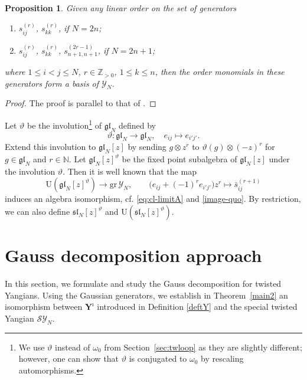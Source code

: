 \documentclass[11pt,reqno]{amsart}
\numberwithin{equation}{section}
\newtheorem{prop}[thm]{Proposition}
\theoremstyle{definition}
\theoremstyle{remark}
\newcommand{\beq}{\begin{equation}}
\newcommand{\eeq}{\end{equation}}
\newcommand{\bZ}{\mathbb{Z}}
\newcommand{\bN}{\mathbb{N}}
\newcommand{\gl}{\mathfrak{gl}}
\newcommand{\gr}{{\mathrm{gr}}}
\newcommand{\lle}{\leqslant}
\newcommand{\Y}{{\mathscr{Y}}}
\newcommand{\SY}{{\mathscr{SY}}}
\newcommand{\Yi}{{\mathbf{Y}^\imath}}
\begin{document}
\begin{prop}\label{pbwprop1}
Given any linear order on the set of generators
\begin{enumerate}
    \item $s_{ij}^{(r)}$, $s_{kk}^{(r)}$, if $N=2n$;
    \item $s_{ij}^{(r)}$, $s_{kk}^{(r)}$, $s_{n+1,n+1}^{(2r-1)}$, if $N=2n+1$;
\end{enumerate}
where $1\lle i<j\lle N$, $r\in\bZ_{>0}$, $1\lle k\lle n$, then the order monomials in these generators form a basis of $\Y_N$.
\end{prop}
\begin{proof}
The proof is parallel to that of \cite[Thm. 3.1 \& Coro. 3.2]{MR02}.
\end{proof}

Let $\vartheta$ be the involution\footnote{We use $\vartheta$ instead of $\omega_0$ from Section~\ref{sec:twloop} as they are slightly different; however, one can show that $\vartheta$ is conjugated to $\omega_0$ by rescaling automorphisms.} of $\gl_N$ defined by
\beq\label{varth}
\vartheta: \gl_N\longrightarrow \gl_N,\quad e_{ij}\mapsto e_{i'j'}.
\eeq
Extend this involution to $\gl_N[z]$ by sending $g\otimes z^r$ to $\vartheta(g)\otimes(-z)^r$ for $g\in \gl_N$ and $r\in\bN$. Let $\gl_N[z]^\vartheta$ be the fixed point subalgebra of $\gl_N[z]$ under the involution $\vartheta$. Then it is well known that the map
\beq\label{isogr}
\mathrm{U}(\gl_N[z]^\vartheta)\longrightarrow \gr\,\Y_N,\qquad \big(e_{ij}+(-1)^re_{i'j'}\big) z^{r} \mapsto \bar s_{ij}^{(r+1)}
\eeq
induces an algebra isomorphism, cf. \eqref{eq:cl-limitA} and \eqref{image-quo}. By restriction, we can also define $\mathfrak{sl}_N[z]^\vartheta$ and $\mathrm U(\mathfrak{sl}_N[z]^\vartheta)$.

\section{Gauss decomposition approach}\label{sec:GD}

In this section, we formulate and study the Gauss decomposition for twisted Yangians. Using the Gaussian generators, we establish in Theorem~\ref{main2} an isomorphism between $\Yi$ introduced in Definition \ref{deftY} and the special twisted Yangian $\SY_N$.
\end{document}
